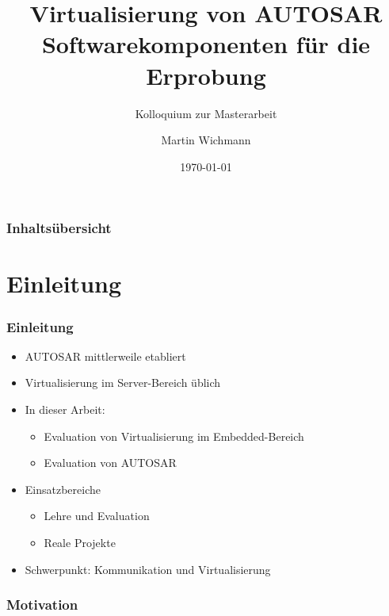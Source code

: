 \documentclass[]{beamer}
\author{Martin Wichmann}
\title[Virtualisierung von AUTOSAR Softwarekomponenten]{Virtualisierung von AUTOSAR Softwarekomponenten für die Erprobung}
\subtitle{Kolloquium zur Masterarbeit}
\date{\today}
\institute{Ostfalia Hochschule für angewandte Wissenschaften}
\newcommand{\inputImage}[1]{}
\begin{document}
\begin{frame}
\maketitle
\end{frame}


\begin{frame}
\frametitle{Inhaltsübersicht}
\tableofcontents[hideallsubsections] %
\end{frame}





\section{Einleitung}
\label{sec:einleitung}

\begin{frame}
\frametitle{Einleitung}
    \begin{itemize}
        \item AUTOSAR mittlerweile etabliert
        \item Virtualisierung im Server-Bereich üblich
        \item In dieser Arbeit:
        \begin{itemize}
            \item Evaluation von Virtualisierung im Embedded-Bereich
            \item Evaluation von AUTOSAR
        \end{itemize}
        \item Einsatzbereiche
        \begin{itemize}
            \item Lehre und Evaluation
            \item Reale Projekte
        \end{itemize}
        \item Schwerpunkt: Kommunikation und Virtualisierung
    \end{itemize}
\end{frame}



\begin{frame}
\frametitle{Motivation}
    \begin{figure}[ht]
        \centering
        \resizebox{0.9\linewidth}{!}{\inputImage{arch_begin.dia}}
        \label{fig:fallbeispiel}
    \end{figure}
\end{frame}
\end{document}
